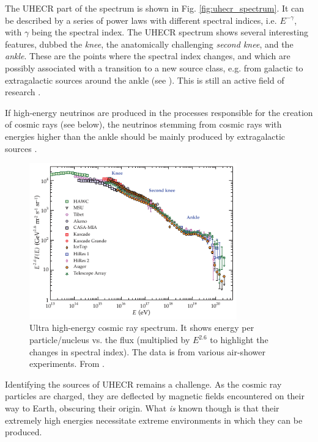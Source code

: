 \documentclass[
    a4paper, %
    fontsize=10pt, %
    twoside=false, %
    numbers=noenddot, %
    fontmethod=tex,
]{kaobook}
\begin{document}
The UHECR part of the spectrum is shown in Fig. \ref{fig:uhecr_spectrum}. It can be described by a series of power laws with different spectral indices, i.e. $E^{-\gamma}$, with $\gamma$ being the spectral index. The UHECR spectrum shows several interesting features, dubbed the \textit{knee}, the anatomically challenging \textit{second knee}, and the \textit{ankle}. These are the points where the spectral index changes, and which are possibly associated with a transition to a new source class, e.g. from galactic to extragalactic sources around the ankle (see ). This is still an active field of research \cite{Workman2022}.

If high-energy neutrinos are produced in the processes responsible for the creation of cosmic rays (see below), the neutrinos stemming from cosmic rays with energies higher than the ankle should be mainly produced by extragalactic sources .

\begin{figure}[htb]
    \includegraphics[width=0.8\textwidth]{theory/cr_uhecr_spectrum.pdf}
    \caption[UHECR spectrum]{Ultra high-energy cosmic ray spectrum. It shows energy per particle/nucleus vs. the flux (multiplied by $E^{2.6}$ to highlight the changes in spectral index). The data is from various air-shower experiments. From \cite{Workman2022}.}
\end{figure}

Identifying the sources of UHECR remains a challenge. As the cosmic ray particles are charged, they are deflected by magnetic fields encountered on their way to Earth, obscuring their origin. What \textit{is} known though is that their extremely high energies necessitate extreme environments in which they can be produced.
\end{document}
